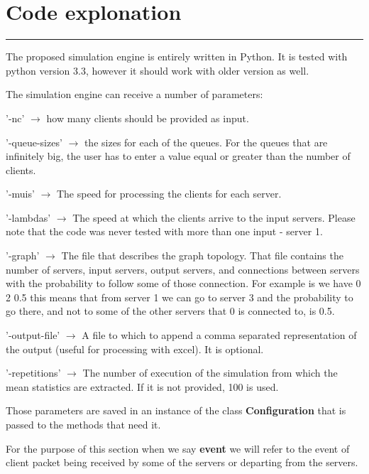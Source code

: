 \documentclass[12pt]{article}
\newcommand{\hr}{\rule{\linewidth}{0.1mm}}
\newenvironment{itemize*}{
  \begin{itemize}[noitemsep,nolistsep]
    \setlength{\itemsep}{0pt}
    \setlength{\parskip}{0pt}
    \setlength{\parsep}{0pt}
}{
  \end{itemize}
}
\theoremstyle{plain}
\begin{document}
\section*{\centering
  Code explonation
}

\hr

The proposed simulation engine is entirely written in Python. It is tested with
python version 3.3, however it should work with older version as well.

The simulation engine can receive a number of parameters: 
\begin{itemize*}
  \item '-nc' $\rightarrow$ how many clients should be provided as input.
  \item '-queue-sizes' $\rightarrow$ the sizes for each of the queues. For the
    queues that are infinitely big, the user has to enter a value equal or 
    greater than the number of clients.
  \item '-muis' $\rightarrow$ The speed for processing the clients for each 
    server.
  \item '-lambdas' $ \rightarrow $ The speed at which the clients arrive to the
    input servers. Please note that the code was never tested with more than
    one input - server 1.
  \item '-graph' $ \rightarrow $ The file that describes the graph topology.
    That file contains the number of servers, input servers, output servers,
    and connections between servers with the probability to follow some of 
    those connection. For example is we have 0 2 0.5 this means that from 
    server 1 we can go to server 3 and the probability to go there, and not to
    some of the other servers that 0 is connected to, is 0.5.
  \item '-output-file' $ \rightarrow $ A file to which to append a comma
    separated representation of the output (useful for processing with excel).
    It is optional.
  \item '-repetitions' $ \rightarrow $ The number of execution of the simulation
    from which the mean statistics are extracted. If it is not provided, 100 is
    used.
\end{itemize*}

Those parameters are saved in an instance of the class \textbf{Configuration}
that is passed to the methods that need it.

For the purpose of this section when we say \textbf{event} we will refer to the
event of client packet being received by some of the servers or departing from
the servers.
\end{document}
